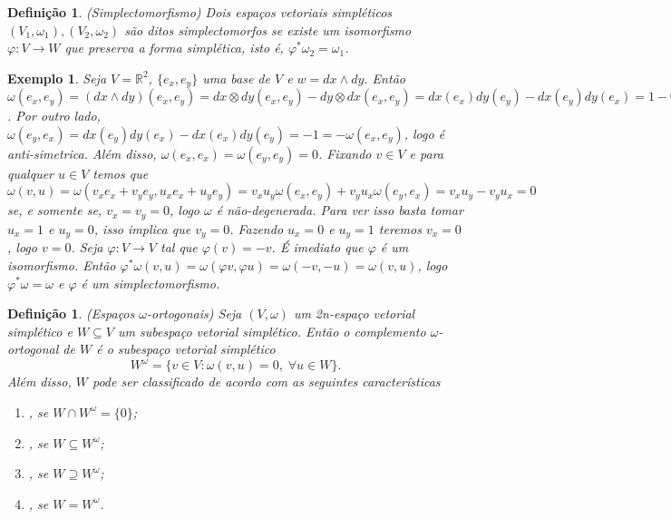 \documentclass[12pt]{book}
\newtheorem{definicao}[teorema]{Definição}
\newtheorem{exemplo}[teorema]{Exemplo}
\newcommand{\espacoSimpleticoOrtogonal}[1]{#1^{\omega}}
\newcommand{\real}[1]{\mathbb{R}^{#1}}
\begin{document}
	\begin{definicao}
		(Simplectomorfismo) Dois espaços vetoriais simpléticos $(V_{1}, \omega_{1}), (V_{2}, \omega_{2})$ são ditos simplectomorfos se existe um isomorfismo $\varphi:V\to W$ que preserva a forma simplética, isto é, $\varphi^{*}\omega_{2} = \omega_{1}$.
	\end{definicao}
	\begin{exemplo}\label{exemplo_espaco_simpletico_real}
		Seja $V = \real{2}$, $\{e_{x}, e_{y}\}$ uma base de $V$ e $w=dx \wedge dy$. Então $\omega(e_{x}, e_{y}) = (dx \wedge dy)(e_{x}, e_{y}) = dx\otimes dy(e_{x}, e_{y})-dy\otimes dx(e_{x}, e_{y}) =dx(e_{x}) dy(e_{y}) - dx(e_{y}) dy(e_{x}) = 1-0= 1$. Por outro lado, $\omega(e_{y}, e_{x}) =dx(e_{y}) dy(e_{x}) - dx(e_{x}) dy(e_{y}) =-1 =-\omega(e_{x}, e_{y})$, logo é anti-simetrica. Além disso, $\omega(e_{x}, e_{x}) = \omega(e_{y}, e_{y}) = 0$. Fixando $v \in V$ e para qualquer $u \in V$ temos que $\omega(v, u) = \omega(v_{x}e_{x}+v_{y}e_{y}, u_{x}e_{x}+u_{y}e_{y}) = v_{x}u_{y}\omega(e_{x}, e_{y}) +v_{y}u_{x}\omega(e_{y}, e_{x}) = v_{x}u_{y} -v_{y}u_{x} = 0$ se, e somente se, $v_{x}=v_{y}=0$, logo $\omega$ é não-degenerada. Para ver isso basta tomar $u_{x} = 1$ e $u_{y} = 0$, isso implica que $v_{y} = 0$. Fazendo $u_{x} = 0$ e $u_{y} = 1$ teremos $v_{x} = 0$, logo $v=0$. Seja $\varphi:V \to V$ tal que $\varphi(v) = -v$. É imediato que $\varphi$ é um isomorfismo. Então $\varphi^{*}\omega(v, u) = \omega(\varphi v, \varphi u)=\omega(-v, -u)=\omega(v, u)$, logo $\varphi^{*}\omega = \omega$ e $\varphi$ é um simplectomorfismo.
	\end{exemplo}
	
	\begin{definicao}\label{definicao_subespaco_simpletico_ortogonais}
		(Espaços $\omega$-ortogonais) Seja $(V, \omega)$ um 2n-espaço vetorial simplético e $W\subseteq V$ um subespaço vetorial simplético. Então o complemento $\omega$-ortogonal de $W$ é o subespaço vetorial simplético
		$$
		W^{\omega} = \{v\in V: \omega(v,u) = 0,\;\forall u\in W \}.
		$$
		Além disso, $W$ pode ser classificado de acordo com as seguintes características
		\begin{enumerate}
			\item {}, se $W\cap \espacoSimpleticoOrtogonal{W} = \{0\}$;
			
			\item {}, se $W \subseteq \espacoSimpleticoOrtogonal{W}$;
			
			\item {}, se $W\supseteq \espacoSimpleticoOrtogonal{W}$;
			
			\item {}, se $W =\espacoSimpleticoOrtogonal{W}$.
		\end{enumerate}
	\end{definicao}
	
\end{document}
